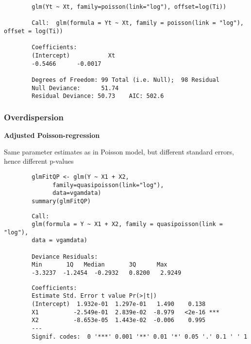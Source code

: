 \documentclass{beamer}
\begin{document}
	\begin{frame}[fragile]
		\begin{verbatim}
		glm(Yt ~ Xt, family=poisson(link="log"), offset=log(Ti))
		
		Call:  glm(formula = Yt ~ Xt, family = poisson(link = "log"), offset = log(Ti))
		
		Coefficients:
		(Intercept)           Xt  
		-0.5466      -0.0017  
		
		Degrees of Freedom: 99 Total (i.e. Null);  98 Residual
		Null Deviance:      51.74 
		Residual Deviance: 50.73    AIC: 502.6
		\end{verbatim}
	\end{frame}
	\begin{frame}[fragile]
		\frametitle{Overdispersion}
		\textbf{Adjusted Poisson-regression}
		
		Same parameter estimates as in Poisson model, but different standard errors, hence different p-values
		\begin{framed}
		\begin{verbatim}
		glmFitQP <- glm(Y ~ X1 + X2, 
		      family=quasipoisson(link="log"), 
		      data=vgamdata)
		summary(glmFitQP)
		\end{verbatim}
		\end{framed}
	\end{frame}
	\begin{frame}[fragile]
		\begin{verbatim}
		Call:
		glm(formula = Y ~ X1 + X2, family = quasipoisson(link = "log"), 
		data = vgamdata)
		
		Deviance Residuals: 
		Min       1Q   Median       3Q      Max  
		-3.3237  -1.2454  -0.2932   0.8200   2.9249  
		\end{verbatim}
	\end{frame}
	\begin{frame}[fragile]
		\begin{verbatim}
		Coefficients:
		Estimate Std. Error t value Pr(>|t|)    
		(Intercept)  1.932e-01  1.297e-01   1.490    0.138    
		X1          -2.549e-01  2.839e-02  -8.979   <2e-16 ***
		X2          -8.653e-05  1.443e-02  -0.006    0.995    
		---
		Signif. codes:  0 '***' 0.001 '**' 0.01 '*' 0.05 '.' 0.1 ' ' 1
		\end{verbatim}
	\end{frame}
\end{document}
